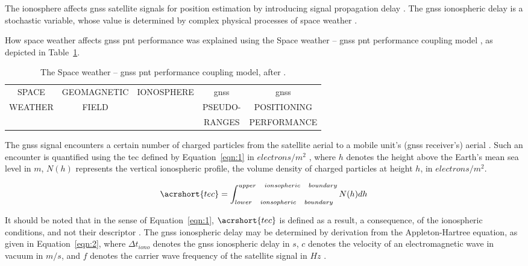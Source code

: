 \documentclass[sn-mathphys-num]{sn-jnl}%
\begin{document}
The ionosphere affects \acrshort{gnss} satellite signals for position estimation by introducing signal propagation delay \cite{spilker1996global, filic2018modelling}. The \acrshort{gnss} ionospheric delay is a stochastic variable, whose value is determined by complex physical processes of space weather \cite{filic2018modelling, filjar2022application}.

How space weather affects \acrshort{gnss} \acrshort{pnt} performance was explained using the Space weather – \acrshort{gnss} \acrshort{pnt} performance coupling model \cite{filic2018modelling}, as depicted in Table~\ref{tab:SpaceWeather}.

\begin{table}[!ht]
    \centering
    \caption{The Space weather – \acrshort{gnss} \acrshort{pnt} performance coupling model, after \cite{filic2018modelling}.}
    \label{tab:SpaceWeather}
    \begin{tabular}{|c|c|c|c|c|}
        \hline
        SPACE & GEOMAGNETIC & IONOSPHERE & \acrshort{gnss} & \acrshort{gnss} \\
        WEATHER & FIELD & & PSEUDO- & POSITIONING \\
         & & & RANGES & PERFORMANCE \\
        \hline
    \end{tabular}
\end{table}

The \acrshort{gnss} signal encounters a certain number of charged particles from the satellite aerial to a mobile unit’s (\acrshort{gnss} receiver’s) aerial \cite{filic2018modelling, filic2018modelling}. Such an encounter is quantified using the \acrfull{tec} defined by Equation~\ref{eqn:1} in $electrons/m^{2}$  \cite{filic2018modelling, davies1990ionospheric}, where $h$ denotes the height above the Earth’s mean sea level in $m$, $N(h)$ represents the vertical ionospheric profile, the volume density of charged particles at height $h$, in $electrons/m^{2}$.

\begin{equation}
	\acrshort{tec} = \int_{lower \quad ionsopheric \quad boundary}^{upper \quad ionsopheric \quad boundary}N(h)dh
	\label{eqn:1}
\end{equation}

It should be noted that in the sense of Equation~\ref{eqn:1}, $\acrshort{tec}$ is defined as a result, a consequence, of the ionospheric conditions, and not their descriptor \cite{filjar2022application}. The \acrshort{gnss} ionospheric delay may be determined by derivation from the Appleton-Hartree equation, as given in Equation~\ref{eqn:2}, where $\Delta t_{iono}$ denotes the \acrshort{gnss} ionospheric delay in $s$, $c$ denotes the velocity of an electromagnetic wave in vacuum in $m/s$, and $f$ denotes the carrier wave frequency of the satellite signal in $Hz$ \cite{spilker1996global, filic2018modelling}.
\end{document}
